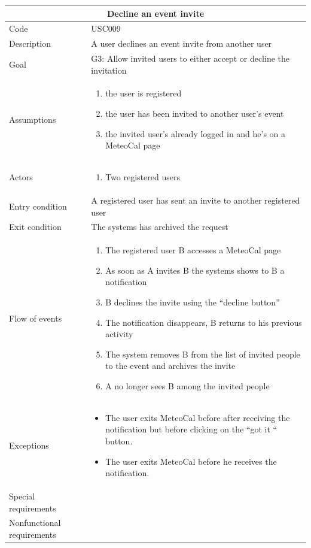 \documentclass[10pt,a4paper,titlepage]{article}
\begin{document}
\begin{tabular}[h]{| p{3cm} | p{10cm} |}
\hline \multicolumn{2}{|c|}{\textbf{Decline an event invite}} \\ 
\hline Code & USC009 \\ 
\hline Description & A user declines an event invite from another user \\
\hline Goal & G3: Allow invited users to either accept or decline the invitation\\
\hline Assumptions  & \begin{enumerate}
\item the user is registered
\item the user has been invited to another user's event
\item the invited user's already logged in and he's on a MeteoCal page
\end{enumerate} \\
\hline Actors &  \begin{enumerate}
\item Two registered users
\end{enumerate} \\
\hline Entry condition & A registered user has sent an invite to another registered user\\
\hline Exit condition & The systems has archived the request\\
\hline Flow of events & \begin{enumerate}
\item The registered user B accesses a MeteoCal page
\item As soon as A invites B the systems shows to B a notification
\item B declines the invite using the “decline button”
\item The notification disappears, B returns to his previous activity
\item The system removes B from the list of invited people to the event and archives the invite
\item A no longer sees B among the invited people
\end{enumerate}\\
\hline Exceptions & \begin{itemize}
\item The user exits MeteoCal before after receiving the notification but before clicking on the “got it “ button.
\item The user exits MeteoCal before he receives the notification. 
\end{itemize} \\
\hline Special requirements & \\
\hline Nonfunctional requirements &\\
\hline
\end{tabular}
\end{document}
